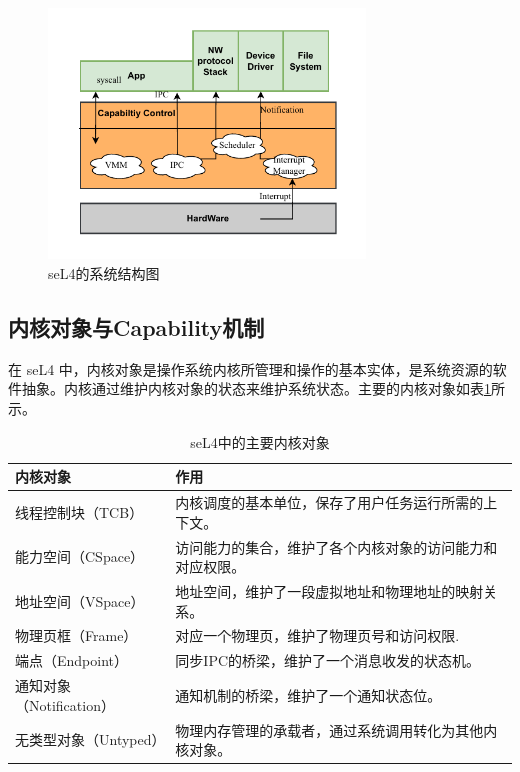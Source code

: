 \begin{figure}[htbp]
  \centering
  \includegraphics[width=0.75\textwidth]{figures/seL4_framwork.drawio.pdf}
  \caption{seL4的系统结构图}\label{fig:seL4_frramework}
\end{figure}

\subsection{内核对象与Capability机制}

在 seL4 中，内核对象是操作系统内核所管理和操作的基本实体，是系统资源的软件抽象。内核通过维护内核对象的状态来维护系统状态。主要的内核对象如表\ref{tab:kernel_object}所示。

\begin{table}[htbp]
  \centering
  \caption{seL4中的主要内核对象} \label{tab:kernel_object}
  \begin{tabular*}{1.0\textwidth}{@{\extracolsep{\fill}}ll}
  \toprule
    内核对象			&作用	 \\
  \midrule
    线程控制块（TCB）			&内核调度的基本单位，保存了用户任务运行所需的上下文。 \\
    能力空间（CSpace）			&访问能力的集合，维护了各个内核对象的访问能力和对应权限。	 \\
    地址空间（VSpace） &地址空间，维护了一段虚拟地址和物理地址的映射关系。	 \\
    物理页框（Frame）  &对应一个物理页，维护了物理页号和访问权限.\\
    端点（Endpoint）	&同步IPC的桥梁，维护了一个消息收发的状态机。 \\
    通知对象（Notification） &通知机制的桥梁，维护了一个通知状态位。\\
    无类型对象（Untyped）&物理内存管理的承载者，通过系统调用转化为其他内核对象。 \\
  \bottomrule
  \end{tabular*}
\end{table}

